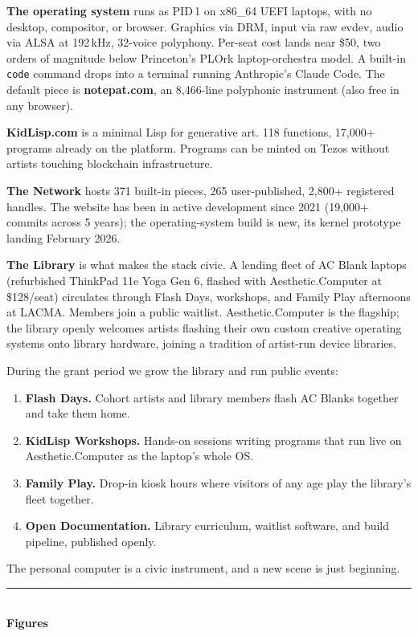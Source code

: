 \documentclass[12pt,letterpaper]{article}
\newcommand{\ac}{Aesthetic{\color{acpink}.}Computer}
\newcommand{\achead}[1]{%
  \vspace{1.6em}%
  {\color{acpink}\noindent\rule{\textwidth}{1.5pt}}\\[0.4em]
  {\large\bfseries #1}%
  \vspace{0.4em}%
}
\begin{document}
\textbf{The operating system} runs as PID\,1 on x86\_64 UEFI laptops, with no desktop, compositor, or browser. Graphics via DRM, input via raw evdev, audio via ALSA at 192\,kHz, 32-voice polyphony. Per-seat cost lands near \$50, two orders of magnitude below Princeton's PLOrk laptop-orchestra model. A built-in \texttt{code} command drops into a terminal running Anthropic's Claude Code. The default piece is \textbf{notepat.com}, an 8,466-line polyphonic instrument (also free in any browser).

\textbf{KidLisp.com} is a minimal Lisp for generative art. 118 functions, 17,000+ programs already on the platform. Programs can be minted on Tezos without artists touching blockchain infrastructure.

\textbf{The Network} hosts 371 built-in pieces, 265 user-published, 2,800+ registered handles. The website has been in active development since 2021 (19,000+ commits across 5 years); the operating-system build is new, its kernel prototype landing February 2026.

\textbf{The Library} is what makes the stack civic. A lending fleet of AC Blank laptops (refurbished ThinkPad 11e Yoga Gen 6, flashed with \ac{} at \$128/seat) circulates through Flash Days, workshops, and Family Play afternoons at LACMA. Members join a public waitlist. \ac{} is the flagship; the library openly welcomes artists flashing their own custom creative operating systems onto library hardware, joining a tradition of artist-run device libraries.

During the grant period we grow the library and run public events:

\begin{enumerate}
  \item \textbf{Flash Days.} Cohort artists and library members flash AC Blanks together and take them home.
  \item \textbf{KidLisp Workshops.} Hands-on sessions writing programs that run live on \ac{} as the laptop's whole OS.
  \item \textbf{Family Play.} Drop-in kiosk hours where visitors of any age play the library's fleet together.
  \item \textbf{Open Documentation.} Library curriculum, waitlist software, and build pipeline, published openly.
\end{enumerate}

The personal computer is a civic instrument, and a new scene is just beginning.

\achead{Figures}
\end{document}

